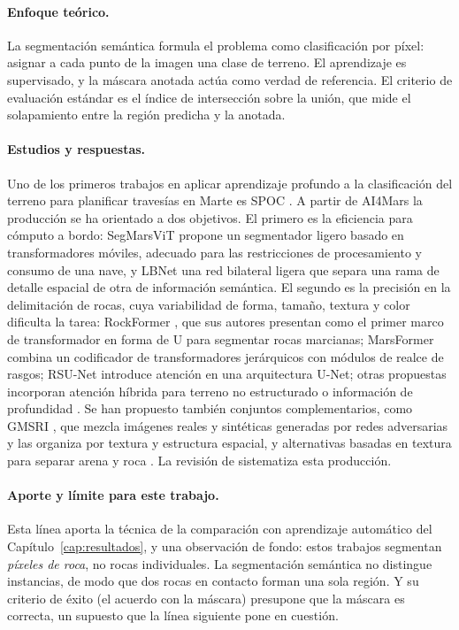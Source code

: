 \paragraph{Enfoque teórico.} La segmentación semántica formula el problema como clasificación
por píxel: asignar a cada punto de la imagen una clase de terreno. El aprendizaje es
supervisado, y la máscara anotada actúa como verdad de referencia. El criterio de evaluación
estándar es el índice de intersección sobre la unión, que mide el solapamiento entre la
región predicha y la anotada.

\paragraph{Estudios y respuestas.} Uno de los primeros trabajos en aplicar aprendizaje profundo
a la clasificación del terreno para planificar travesías en Marte es SPOC
\citep{rothrock2016spoc}. A partir de AI4Mars
\citep{swan2021ai4mars} la producción se ha orientado a dos objetivos. El primero es la
eficiencia para cómputo a bordo: SegMarsViT \citep{dai2022segmarsvit} propone un segmentador
ligero basado en transformadores móviles, adecuado para las restricciones de procesamiento y
consumo de una nave, y LBNet \citep{wei2024lbnet} una red bilateral ligera que separa una rama
de detalle espacial de otra de información semántica. El segundo es la precisión en la
delimitación de rocas, cuya variabilidad de forma, tamaño, textura y color dificulta la tarea:
RockFormer \citep{liu2023rockformer}, que sus autores presentan como el primer marco de
transformador en forma de U para segmentar rocas marcianas; MarsFormer \citep{xiong2023marsformer} combina un codificador de
transformadores jerárquicos con módulos de realce de rasgos; RSU-Net \citep{tian2024rsunet}
introduce atención en una arquitectura U-Net; otras propuestas incorporan atención híbrida
para terreno no estructurado \citep{liu2023hybrid} o información de profundidad
\citep{ma2025depthformer}. Se han propuesto también conjuntos complementarios, como GMSRI
\citep{wang2021gmsri}, que mezcla imágenes reales y sintéticas generadas por redes
adversarias y las organiza por textura y estructura espacial, y alternativas basadas en
textura para separar arena y roca \citep{alkawi2025texture}. La revisión de
\citet{qu2025review} sistematiza esta producción.

\paragraph{Aporte y límite para este trabajo.} Esta línea aporta la técnica de la
comparación con aprendizaje automático del Capítulo~\ref{cap:resultados}, y una observación
de fondo: estos trabajos segmentan \textit{píxeles de roca}, no rocas individuales. La
segmentación semántica no distingue instancias, de modo que dos rocas en contacto forman una
sola región. Y su criterio de éxito (el acuerdo con la máscara) presupone que la máscara es
correcta, un supuesto que la línea siguiente pone en cuestión.

